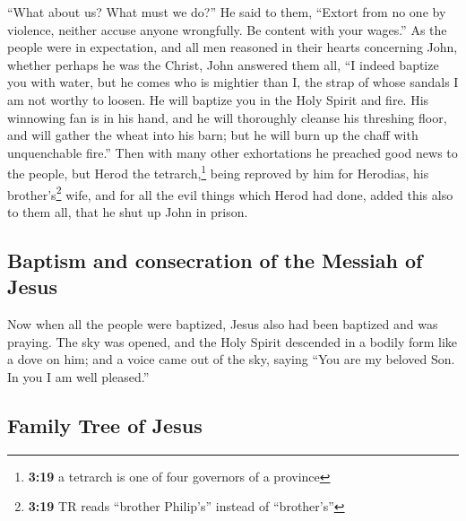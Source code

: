 ``What about us? What must we do?'' He said to them, ``Extort from no
one by violence, neither accuse anyone wrongfully. Be content with your
wages.''  As the people were in expectation, and all men
reasoned in their hearts concerning John, whether perhaps he was the
Christ,  John answered them all, ``I indeed baptize you
with water, but he comes who is mightier than I, the strap of whose
sandals I am not worthy to loosen. He will baptize you in the Holy
Spirit and fire.  His winnowing fan is in his hand, and
he will thoroughly cleanse his threshing floor, and will gather the
wheat into his barn; but he will burn up the chaff with unquenchable
fire.''  Then with many other exhortations he preached
good news to the people,  but Herod the
tetrarch,\footnote{\textbf{3:19} a tetrarch is one of four governors of
  a province} being reproved by him for Herodias, his
brother's\footnote{\textbf{3:19} TR reads ``brother Philip's'' instead
  of ``brother's''} wife, and for all the evil things which Herod had
done,  added this also to them all, that he shut up John
in prison.

\hypertarget{baptism-and-consecration-of-the-messiah-of-jesus}{%
\subsection{Baptism and consecration of the Messiah of
Jesus}\label{baptism-and-consecration-of-the-messiah-of-jesus}}

 Now when all the people were baptized, Jesus also had
been baptized and was praying. The sky was opened,  and
the Holy Spirit descended in a bodily form like a dove on him; and a
voice came out of the sky, saying ``You are my beloved Son. In you I am
well pleased.''

\hypertarget{family-tree-of-jesus}{%
\subsection{Family Tree of Jesus}\label{family-tree-of-jesus}}

